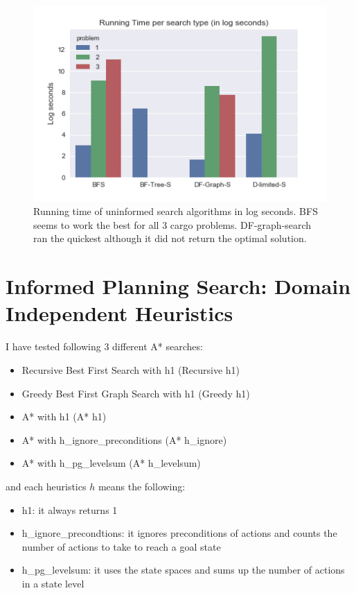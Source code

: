 \documentclass[letterpaper]{article}
\begin{document}
\begin{figure}
\includegraphics[scale=1]{assets/uninformed_search.png}
\caption{Running time of uninformed search algorithms in log seconds. BFS seems to work the best for all 3 cargo problems. DF-graph-search ran the quickest although it did not return the optimal solution.}
\label{fig:usa}
\end{figure}

\newpage
\section{Informed Planning Search: Domain Independent Heuristics}
I have tested following 3 different A* searches:
\begin{itemize}
\item Recursive Best First Search with h1 (Recursive h1)
\item Greedy Best First Graph Search with h1 (Greedy h1)
\item A* with h1 (A* h1)
\item A* with h\_ignore\_preconditions (A* h\_ignore)
\item A* with h\_pg\_levelsum (A* h\_levelsum)
\end{itemize}

and each heuristics $h$ means the following:
\begin{itemize}
       \item h1: it always returns 1
       \item h\_ignore\_precondtions: it ignores preconditions of actions and counts the number of actions to take to reach a goal state 
       \item h\_pg\_levelsum: it uses the state spaces and sums up the number of actions in a state level
\end{itemize}
\end{document}
